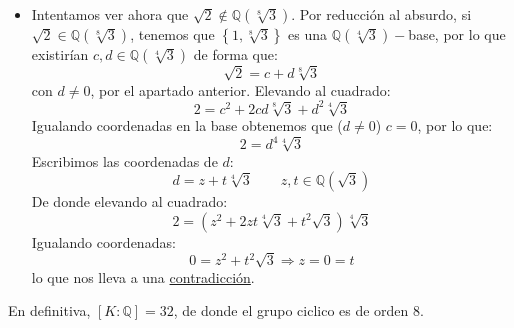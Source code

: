 \begin{ejemplo}
\begin{itemize}
\begin{itemize}
                    \begin{equation*}
                        0 = x^2 + 3y^2  \Longrightarrow x = 0 = y
                    \end{equation*}
                    Luego $b= 0 \Longrightarrow 2 = 0$ \underline{contradicción}, que viene de suponer que teníamos $\sqrt{2}\in \mathbb{Q}\left(\sqrt[4]{3}\right)$.
            \end{itemize}
        \item Intentamos ver ahora que $\sqrt{2}\notin \mathbb{Q}\left(\sqrt[8]{3}\right)$. Por reducción al absurdo, si $\sqrt{2}\in \mathbb{Q}\left(\sqrt[8]{3}\right)$, tenemos que $\left\{1,\sqrt[8]{3}\right\}$  es una $\mathbb{Q}\left(\sqrt[4]{3}\right)-$base, por lo que existirían $c,d\in \mathbb{Q}\left(\sqrt[4]{3}\right)$ de forma que:
            \begin{equation*}
                \sqrt{2} = c+d\sqrt[8]{3}
            \end{equation*}
            con $d\neq 0$, por el apartado anterior. Elevando al cuadrado:
            \begin{equation*}
                2 = c^2 + 2cd\sqrt[8]{3} + d^2\sqrt[4]{3}
            \end{equation*}
            Igualando coordenadas en la base obtenemos que ($d\neq 0$) $c=0$, por lo que:
            \begin{equation*}
                2 = d^4\sqrt[4]{3} 
            \end{equation*}
            Escribimos las coordenadas de $d$:
            \begin{equation*}
                d = z + t\sqrt[4]{3} \qquad z,t\in \mathbb{Q}\left(\sqrt{3}\right)
            \end{equation*}
            De donde elevando al cuadrado:
            \begin{equation*}
                2 = (z^2 + 2zt\sqrt[4]{3} + t^2 \sqrt{3})\sqrt[4]{3}
            \end{equation*}
            Igualando coordenadas:
            \begin{equation*}
                0 = z^2 + t^2\sqrt{3} \Longrightarrow z = 0 = t
            \end{equation*}
            lo que nos lleva a una \underline{contradicción}.
    \end{itemize} %
    En definitiva, $[K:\mathbb{Q}] = 32$, de donde el grupo ciclico es de orden 8.
\end{ejemplo}

